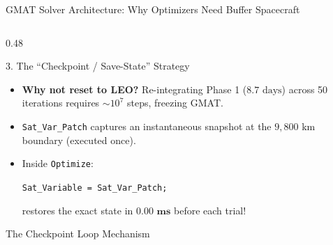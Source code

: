 \documentclass[aspectratio=169, 10pt]{beamer}
\begin{document}
\begin{frame}{GMAT Solver Architecture: Why Optimizers Need Buffer Spacecraft}
\begin{columns}[T]
        \begin{column}{0.48\textwidth}
            \begin{exampleblock}{3. The ``Checkpoint / Save-State'' Strategy}
                \scriptsize
                \begin{itemize}\setlength{\itemsep}{1.2pt}\setlength{\topsep}{0pt}
                    \item \textbf{Why not reset to LEO?} Re-integrating Phase 1 ($8.7\text{ days}$) across 50 iterations requires $\sim 10^7$ steps, freezing GMAT.
                    \item \texttt{Sat\_Var\_Patch} captures an instantaneous snapshot at the $9,800\text{ km}$ boundary (executed once).
                    \item Inside \texttt{Optimize}:
                    \par\vspace{1pt}
                    {\centering \texttt{Sat\_Variable = Sat\_Var\_Patch;} \par}
                    \vspace{1pt}
                    restores the exact state in $\mathbf{0.00\text{ ms}}$ before each trial!
                \end{itemize}
            \end{exampleblock}
            \vspace{-0.12cm}
            \begin{block}{The Checkpoint Loop Mechanism}
                \centering
                \vspace{0.02cm}
\end{block}
\end{column}
\end{columns}
\end{frame}
\end{document}
